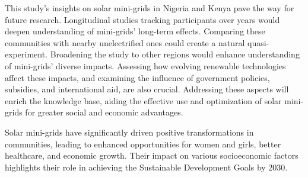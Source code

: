 This study's insights on solar mini-grids in Nigeria and Kenya pave the way for future research. Longitudinal studies tracking participants over years would deepen understanding of mini-grids' long-term effects. Comparing these communities with nearby unelectrified ones could create a natural quasi-experiment. Broadening the study to other regions would enhance understanding of mini-grids' diverse impacts. Assessing how evolving renewable technologies affect these impacts, and examining the influence of government policies, subsidies, and international aid, are also crucial. Addressing these aspects will enrich the knowledge base, aiding the effective use and optimization of solar mini-grids for greater social and economic advantages.

Solar mini-grids have significantly driven positive transformations in communities, leading to enhanced opportunities for women and girls, better healthcare, and economic growth. Their impact on various socioeconomic factors highlights their role in achieving the Sustainable Development Goals by 2030.